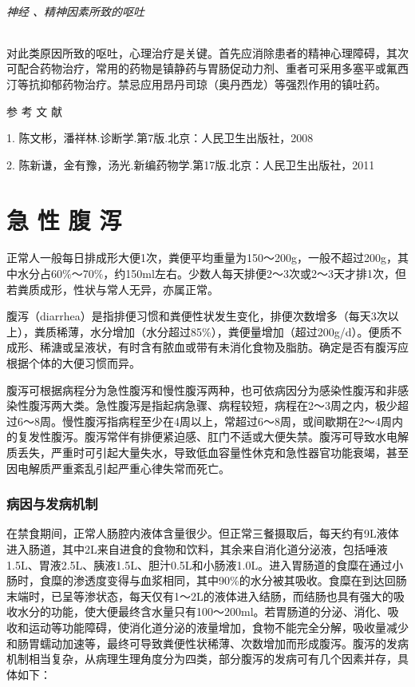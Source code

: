 \subparagraph{神经 、精神因素所致的呕吐}

对此类原因所致的呕吐，心理治疗是关键。首先应消除患者的精神心理障碍，其次可配合药物治疗，常用的药物是镇静药与胃肠促动力剂、重者可采用多塞平或氟西汀等抗抑郁药物治疗。禁忌应用昂丹司琼（奥丹西龙）等强烈作用的镇吐药。

\protect\hypertarget{text00029.html}{}{}

\hypertarget{text00029.htmlux5cux23CHP1-11-4}{}
参 考 文 献

1. 陈文彬，潘祥林.诊断学.第7版.北京：人民卫生出版社，2008

2. 陈新谦，金有豫，汤光.新编药物学.第17版.北京：人民卫生出版社，2011

\protect\hypertarget{text00030.html}{}{}

\chapter{急 性 腹 泻}

正常人一般每日排成形大便1次，粪便平均重量为150～200g，一般不超过200g，其中水分占60\%～70\%，约150ml左右。少数人每天排便2～3次或2～3天才排1次，但若粪质成形，性状与常人无异，亦属正常。

腹泻（diarrhea）是指排便习惯和粪便性状发生变化，排便次数增多（每天3次以上），粪质稀薄，水分增加（水分超过85\%），粪便量增加（超过200g/d）。便质不成形、稀溏或呈液状，有时含有脓血或带有未消化食物及脂肪。确定是否有腹泻应根据个体的大便习惯而异。

腹泻可根据病程分为急性腹泻和慢性腹泻两种，也可依病因分为感染性腹泻和非感染性腹泻两大类。急性腹泻是指起病急骤、病程较短，病程在2～3周之内，极少超过6～8周。慢性腹泻指病程至少在4周以上，常超过6～8周，或间歇期在2～4周内的复发性腹泻。腹泻常伴有排便紧迫感、肛门不适或大便失禁。腹泻可导致水电解质丢失，严重时可引起大量失水，导致低血容量性休克和急性器官功能衰竭，甚至因电解质严重紊乱引起严重心律失常而死亡。

\subsection{病因与发病机制}

在禁食期间，正常人肠腔内液体含量很少。但正常三餐摄取后，每天约有9L液体进入肠道，其中2L来自进食的食物和饮料，其余来自消化道分泌液，包括唾液1.5L、胃液2.5L、胰液1.5L、胆汁0.5L和小肠液1.0L。进入胃肠道的食糜在通过小肠时，食糜的渗透度变得与血浆相同，其中90\%的水分被其吸收。食糜在到达回肠末端时，已呈等渗状态，每天仅有1～2L的液体进入结肠，而结肠也具有强大的吸收水分的功能，使大便最终含水量只有100～200ml。若胃肠道的分泌、消化、吸收和运动等功能障碍，使消化道分泌的液量增加，食物不能完全分解，吸收量减少和肠胃蠕动加速等，最终可导致粪便性状稀薄、次数增加而形成腹泻。腹泻的发病机制相当复杂，从病理生理角度分为四类，部分腹泻的发病可有几个因素并存，具体如下：

